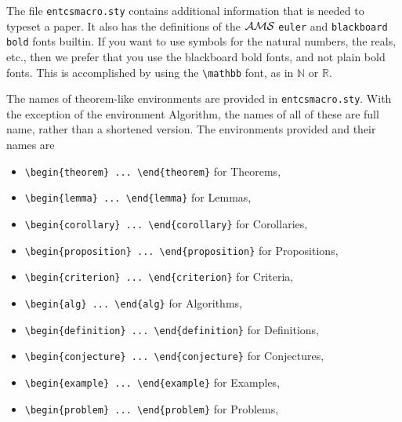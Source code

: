 \documentclass{entcs} \usepackage{entcsmacro}
\newcommand{\Nat}{{\mathbb N}}
\newcommand{\Real}{{\mathbb R}}
\begin{document}
The file \texttt{entcsmacro.sty} contains additional information that
is needed to typeset a paper.  It also has the definitions of the
$\cal AMS$ \texttt{euler} and \texttt{blackboard bold} fonts builtin.
If you want to use symbols for the natural numbers, the reals, etc.,
then we prefer that you use the blackboard bold fonts, and not plain
bold fonts. This is accomplished by using the \verb+\mathbb+ font, as
in $\Nat$ or $\Real$.

The names of theorem-like environments are provided in
\texttt{entcsmacro.sty}.  With the exception of the environment
Algorithm, the names of all of these are full name, rather than a
shortened version. The environments provided and their names are
\begin{itemize}
\item \verb+\begin{theorem} ... \end{theorem}+ for Theorems,
\item \verb+\begin{lemma} ... \end{lemma}+ for Lemmas,
\item \verb+\begin{corollary} ... \end{corollary}+ for Corollaries,
\item \verb+\begin{proposition} ... \end{proposition}+ for
  Propositions,
\item \verb+\begin{criterion} ... \end{criterion}+ for Criteria,
\item \verb+\begin{alg} ... \end{alg}+ for Algorithms,
\item \verb+\begin{definition} ... \end{definition}+ for Definitions,
\item \verb+\begin{conjecture} ... \end{conjecture}+ for Conjectures,
\item \verb+\begin{example} ... \end{example}+ for Examples,
\item \verb+\begin{problem} ... \end{problem}+ for Problems,

\end{itemize}
\end{document}
